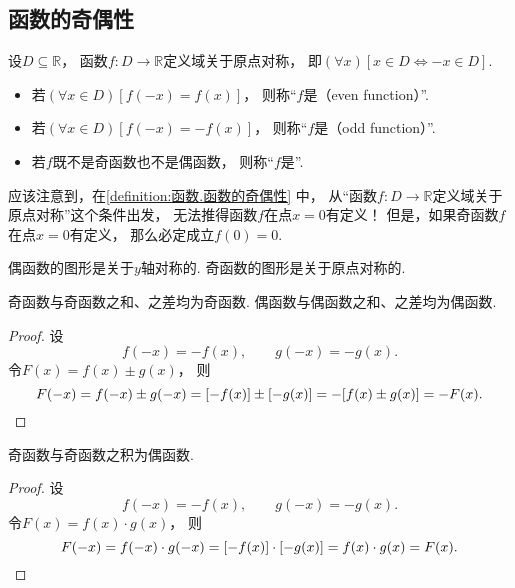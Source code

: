\subsection{函数的奇偶性}
\begin{definition}\label{definition:函数.函数的奇偶性}
设\(D\subseteq\mathbb{R}\)，
函数\(f\colon D\to\mathbb{R}\)定义域关于原点对称，
即\((\forall x)[x \in D \iff -x \in D]\).
\begin{itemize}
	\item 若\((\forall x \in D)
	[f(-x) = f(x)]\)，
	则称“\(f\)是（even function）”.

	\item 若\((\forall x \in D)
	[f(-x) = -f(x)]\)，
	则称“\(f\)是（odd function）”.

	\item 若\(f\)既不是奇函数也不是偶函数，
	则称“\(f\)是”.
\end{itemize}
\end{definition}
\begin{remark}
应该注意到，在\cref{definition:函数.函数的奇偶性} 中，
从“函数\(f\colon D\to\mathbb{R}\)定义域关于原点对称”这个条件出发，
无法推得函数\(f\)在点\(x=0\)有定义！
但是，如果奇函数\(f\)在点\(x=0\)有定义，
那么必定成立\(f(0) = 0\).
\end{remark}

\begin{property}
偶函数的图形是关于\(y\)轴对称的.
奇函数的图形是关于原点对称的.
\end{property}

\begin{property}
奇函数与奇函数之和、之差均为奇函数.
偶函数与偶函数之和、之差均为偶函数.
\begin{proof}
设\[
	f(-x) = -f(x),
	\qquad
	g(-x) = -g(x).
\]
令\(F(x) = f(x) \pm g(x)\)，
则\[
	F(-x) = f(-x) \pm g(-x)
	= [-f(x)] \pm [-g(x)]
	= -[f(x) \pm g(x)]
	= -F(x).
	\qedhere
\]
\end{proof}
\end{property}

\begin{property}
奇函数与奇函数之积为偶函数.
\begin{proof}
设\[
	f(-x) = -f(x),
	\qquad
	g(-x) = -g(x).
\]
令\(F(x) = f(x) \cdot g(x)\)，
则\[
	F(-x) = f(-x) \cdot g(-x)
	= [-f(x)] \cdot [-g(x)]
	= f(x) \cdot g(x)
	= F(x).
	\qedhere
\]
\end{proof}
\end{property}

